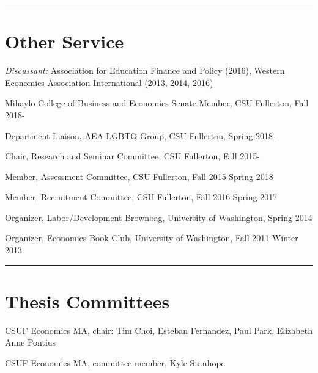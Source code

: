 \documentclass[11pt,a4paper]{article}
\begin{document}
\vspace{1cm} \hrule \vspace{1cm}





\section*{Other Service} 



\emph{Discussant:} Association for Education Finance and Policy (2016), Western Economics Association International (2013, 2014, 2016)



Mihaylo College of Business and Economics Senate Member, CSU Fullerton, Fall 2018-



Department Liaison, AEA LGBTQ Group, CSU Fullerton, Spring 2018-



Chair, Research and Seminar Committee, CSU Fullerton, Fall 2015-



Member, Assessment Committee, CSU Fullerton, Fall 2015-Spring 2018



Member, Recruitment Committee, CSU Fullerton, Fall 2016-Spring 2017



Organizer, Labor/Development Brownbag, University of Washington, Spring 2014



Organizer, Economics Book Club, University of Washington, Fall 2011-Winter 2013



\vspace{1cm} \hrule \vspace{1cm}





\section*{Thesis Committees} 



CSUF Economics MA, chair: Tim Choi, Esteban Fernandez, Paul Park, Elizabeth Anne Pontius



CSUF Economics MA, committee member, Kyle Stanhope
\end{document}

